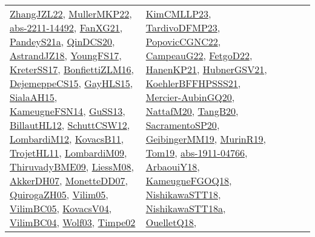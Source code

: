 {\begin{longtable}{lp{3cm}>{\raggedright}p{6cm}>{\raggedright}p{6cm}p{8cm}}
\href{papers/ZhangJZL22.pdf}{ZhangJZL22}\cite{ZhangJZL22}, \href{articles/MullerMKP22.pdf}{MullerMKP22}\cite{MullerMKP22}, \href{articles/abs-2211-14492.pdf}{abs-2211-14492}\cite{abs-2211-14492}, \href{articles/FanXG21.pdf}{FanXG21}\cite{FanXG21}, \href{articles/PandeyS21a.pdf}{PandeyS21a}\cite{PandeyS21a}, \href{articles/QinDCS20.pdf}{QinDCS20}\cite{QinDCS20}, \href{papers/AstrandJZ18.pdf}{AstrandJZ18}\cite{AstrandJZ18}, \href{papers/YoungFS17.pdf}{YoungFS17}\cite{YoungFS17}, \href{articles/KreterSS17.pdf}{KreterSS17}\cite{KreterSS17}, \href{papers/BonfiettiZLM16.pdf}{BonfiettiZLM16}\cite{BonfiettiZLM16}, \href{papers/DejemeppeCS15.pdf}{DejemeppeCS15}\cite{DejemeppeCS15}, \href{papers/GayHLS15.pdf}{GayHLS15}\cite{GayHLS15}, \href{papers/SialaAH15.pdf}{SialaAH15}\cite{SialaAH15}, \href{articles/KameugneFSN14.pdf}{KameugneFSN14}\cite{KameugneFSN14}, \href{papers/GuSS13.pdf}{GuSS13}\cite{GuSS13}, \href{papers/BillautHL12.pdf}{BillautHL12}\cite{BillautHL12}, \href{papers/SchuttCSW12.pdf}{SchuttCSW12}\cite{SchuttCSW12}, \href{articles/LombardiM12.pdf}{LombardiM12}\cite{LombardiM12}, \href{articles/KovacsB11.pdf}{KovacsB11}\cite{KovacsB11}, \href{articles/TrojetHL11.pdf}{TrojetHL11}\cite{TrojetHL11}, \href{papers/LombardiM09.pdf}{LombardiM09}\cite{LombardiM09}, \href{papers/ThiruvadyBME09.pdf}{ThiruvadyBME09}\cite{ThiruvadyBME09}, \href{articles/LiessM08.pdf}{LiessM08}\cite{LiessM08}, \href{papers/AkkerDH07.pdf}{AkkerDH07}\cite{AkkerDH07}, \href{papers/MonetteDD07.pdf}{MonetteDD07}\cite{MonetteDD07}, \href{papers/QuirogaZH05.pdf}{QuirogaZH05}\cite{QuirogaZH05}, \href{papers/Vilim05.pdf}{Vilim05}\cite{Vilim05}, \href{articles/VilimBC05.pdf}{VilimBC05}\cite{VilimBC05}, \href{papers/KovacsV04.pdf}{KovacsV04}\cite{KovacsV04}, \href{papers/VilimBC04.pdf}{VilimBC04}\cite{VilimBC04}, \href{papers/Wolf03.pdf}{Wolf03}\cite{Wolf03}, \href{articles/Timpe02.pdf}{Timpe02}\cite{Timpe02} & \href{papers/KimCMLLP23.pdf}{KimCMLLP23}\cite{KimCMLLP23}, \href{papers/TardivoDFMP23.pdf}{TardivoDFMP23}\cite{TardivoDFMP23}, \href{papers/PopovicCGNC22.pdf}{PopovicCGNC22}\cite{PopovicCGNC22}, \href{articles/CampeauG22.pdf}{CampeauG22}\cite{CampeauG22}, \href{articles/FetgoD22.pdf}{FetgoD22}\cite{FetgoD22}, \href{papers/HanenKP21.pdf}{HanenKP21}\cite{HanenKP21}, \href{articles/HubnerGSV21.pdf}{HubnerGSV21}\cite{HubnerGSV21}, \href{articles/KoehlerBFFHPSSS21.pdf}{KoehlerBFFHPSSS21}\cite{KoehlerBFFHPSSS21}, \href{papers/Mercier-AubinGQ20.pdf}{Mercier-AubinGQ20}\cite{Mercier-AubinGQ20}, \href{papers/NattafM20.pdf}{NattafM20}\cite{NattafM20}, \href{papers/TangB20.pdf}{TangB20}\cite{TangB20}, \href{articles/SacramentoSP20.pdf}{SacramentoSP20}\cite{SacramentoSP20}, \href{papers/GeibingerMM19.pdf}{GeibingerMM19}\cite{GeibingerMM19}, \href{papers/MurinR19.pdf}{MurinR19}\cite{MurinR19}, \href{papers/Tom19.pdf}{Tom19}\cite{Tom19}, \href{articles/abs-1911-04766.pdf}{abs-1911-04766}\cite{abs-1911-04766}, \href{papers/ArbaouiY18.pdf}{ArbaouiY18}\cite{ArbaouiY18}, \href{papers/KameugneFGOQ18.pdf}{KameugneFGOQ18}\cite{KameugneFGOQ18}, \href{papers/NishikawaSTT18.pdf}{NishikawaSTT18}\cite{NishikawaSTT18}, \href{papers/NishikawaSTT18a.pdf}{NishikawaSTT18a}\cite{NishikawaSTT18a}, \href{papers/OuelletQ18.pdf}{OuelletQ18}\cite{OuelletQ18}, 
\end{longtable}}
